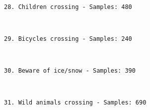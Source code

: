 \documentclass[11pt]{article}
\begin{document}
    \begin{center}
    \end{center}
    { \hspace*{\fill} \\}
    
    \begin{Verbatim}[commandchars=\\\{\}]
28. Children crossing - Samples: 480

    \end{Verbatim}

    \begin{center}
    \end{center}
    { \hspace*{\fill} \\}
    
    \begin{Verbatim}[commandchars=\\\{\}]
29. Bicycles crossing - Samples: 240

    \end{Verbatim}

    \begin{center}
    \end{center}
    { \hspace*{\fill} \\}
    
    \begin{Verbatim}[commandchars=\\\{\}]
30. Beware of ice/snow - Samples: 390

    \end{Verbatim}

    \begin{center}
    \end{center}
    { \hspace*{\fill} \\}
    
    \begin{Verbatim}[commandchars=\\\{\}]
31. Wild animals crossing - Samples: 690

    \end{Verbatim}

    \begin{center}
    \end{center}
    { \hspace*{\fill} \\}
    
\end{document}
